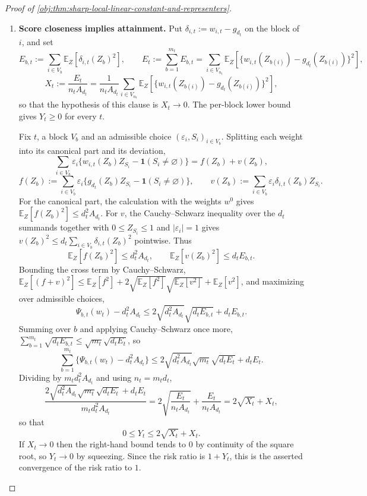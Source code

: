 \documentclass[11pt]{article}
\begin{document}
\begin{proof}[Proof of \cref{obj:thm:sharp-local-linear-constant-and-representers}]
\begin{enumerate}
\item \textbf{Score closeness implies attainment.}  Put \(\delta_{i,t}:=w_{i,t}-g_{d_t}\) on the block of \(i\), and set
\[
E_{b,t}:=\sum_{i\in V_b}\mathbb E_Z\!\left[\delta_{i,t}(Z_b)^2\right],
\qquad
E_t:=\sum_{b=1}^{m_t}E_{b,t}
=\sum_{i\in V_{n_t}}\mathbb E_Z\!\left[\bigl\{w_{i,t}(Z_{b(i)})-g_{d_t}(Z_{b(i)})\bigr\}^2\right],
\]
\[
X_t:=\frac{E_t}{n_tA_{d_t}}
=
\frac{1}{n_tA_{d_t}}
\sum_{i\in V_{n_t}}
\mathbb E_Z\!\left[\bigl\{w_{i,t}(Z_{b(i)})-g_{d_t}(Z_{b(i)})\bigr\}^2\right],
\]
so that the hypothesis of this clause is \(X_t\to0\).  The per-block lower bound gives \(Y_t\ge0\) for every \(t\).

Fix \(t\), a block \(V_b\) and an admissible choice \((\varepsilon_i,S_i)_{i\in V_b}\).  Splitting each weight into its canonical part and its deviation,
\[
\sum_{i\in V_b}\varepsilon_i\bigl\{w_{i,t}(Z_b)Z_{S_i}-\mathbf 1(S_i\ne\varnothing)\bigr\}
=
f(Z_b)+v(Z_b),
\]
\[
f(Z_b):=\sum_{i\in V_b}\varepsilon_i\bigl\{g_{d_t}(Z_b)Z_{S_i}-\mathbf 1(S_i\ne\varnothing)\bigr\},
\qquad
v(Z_b):=\sum_{i\in V_b}\varepsilon_i\delta_{i,t}(Z_b)Z_{S_i}.
\]
For the canonical part, the calculation with the weights \(w^0\) gives \(\mathbb E_Z[f(Z_b)^2]\le d_t^2A_{d_t}\).  For \(v\), the Cauchy--Schwarz inequality over the \(d_t\) summands together with \(0\le Z_{S_i}\le1\) and \(|\varepsilon_i|=1\) gives \(v(Z_b)^2\le d_t\sum_{i\in V_b}\delta_{i,t}(Z_b)^2\) pointwise.  Thus
\[
\mathbb E_Z[f(Z_b)^2]\le d_t^2A_{d_t},
\qquad
\mathbb E_Z[v(Z_b)^2]\le d_tE_{b,t}.
\]
Bounding the cross term by Cauchy--Schwarz, \(\mathbb E_Z[(f+v)^2]\le\mathbb E_Z[f^2]+2\sqrt{\mathbb E_Z[f^2]}\sqrt{\mathbb E_Z[v^2]}+\mathbb E_Z[v^2]\), and maximizing over admissible choices,
\[
\Psi_{b,t}(w_t)-d_t^2A_{d_t}
\le
2\sqrt{d_t^2A_{d_t}}\sqrt{d_tE_{b,t}}+d_tE_{b,t}.
\]
Summing over \(b\) and applying Cauchy--Schwarz once more, \(\sum_{b=1}^{m_t}\sqrt{d_tE_{b,t}}\le\sqrt{m_t}\sqrt{d_tE_t}\), so
\[
\sum_{b=1}^{m_t}\bigl\{\Psi_{b,t}(w_t)-d_t^2A_{d_t}\bigr\}
\le
2\sqrt{d_t^2A_{d_t}}\sqrt{m_t}\sqrt{d_tE_t}+d_tE_t .
\]
Dividing by \(m_td_t^2A_{d_t}\) and using \(n_t=m_td_t\),
\[
\frac{
2\sqrt{d_t^2A_{d_t}}\sqrt{m_t}\sqrt{d_tE_t}+d_tE_t
}{
m_td_t^2A_{d_t}
}
=
2\sqrt{\frac{E_t}{n_tA_{d_t}}}+\frac{E_t}{n_tA_{d_t}}
=
2\sqrt{X_t}+X_t ,
\]
so that
\[
0\le Y_t\le 2\sqrt{X_t}+X_t .
\]
If \(X_t\to0\) then the right-hand bound tends to \(0\) by continuity of the square root, so \(Y_t\to0\) by squeezing.  Since the risk ratio is \(1+Y_t\), this is the asserted convergence of the risk ratio to \(1\). %


\end{enumerate}
\end{proof}
\end{document}
